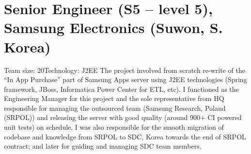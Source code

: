 \documentclass[11pt,a4paper,sans]{moderncv} %
\newcommand\Colorhref[3][blue]{\href{#2}{\small\color{#1}#3}}
\begin{document}

\section{Senior Engineer (S5 -- level 5), Samsung Electronics (Suwon, S. Korea)}
         {Team size: 20}{Technology: J2EE}
         {The project involved from scratch re-write of the ``In App Purchase'' part of Samsung Apps server using J2EE technologies (Spring framework, JBoss, Informatica Power Center for ETL, etc). I functioned as the Engineering Manager for this project and the sole representative from HQ responsible for managing the outsourced team (Samsung Research, Poland (SRPOL)) and releasing the server with good quality (around 900+ CI powered unit tests) on schedule. I was also responsible for the smooth migration of codebase and knowledge from SRPOL to SDC, Korea towards the end of SRPOL contract; and later for guiding and managing SDC team members.}
\end{document}
